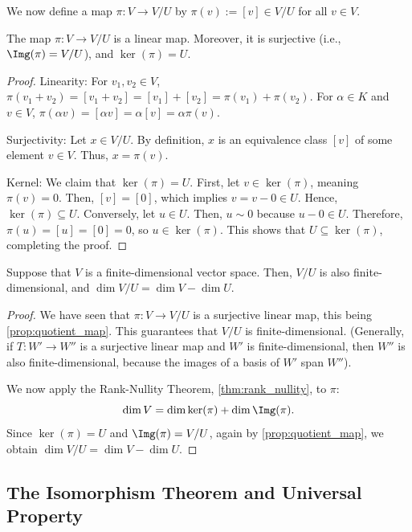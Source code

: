 We now define a map $\pi \colon V \to V/U$ by $\pi(v) := [v] \in V/U$ for all $v \in V$.

\begin{proposition}
  \label{prop:quotient_map}
  The map $\pi \colon V \to V/U$ is a linear map. Moreover, it is surjective (i.e., $\Img(\pi) = V/U$), and $\ker(\pi) = U$.
\end{proposition}

\begin{proof}
  Linearity: For $v_1, v_2 \in V$, $\pi(v_1 + v_2) = [v_1 + v_2] = [v_1] + [v_2] = \pi(v_1) + \pi(v_2)$. For $\alpha \in K$ and $v \in V$, $\pi(\alpha v) = [\alpha v] = \alpha [v] = \alpha \pi(v)$.

  Surjectivity: Let $x \in V/U$. By definition, $x$ is an equivalence class $[v]$ of some element $v \in V$. Thus, $x = \pi(v)$.

  Kernel: We claim that $\ker(\pi) = U$. First, let $v \in \ker(\pi)$, meaning $\pi(v) = 0$. Then, $[v] = [0]$, which implies $v = v - 0 \in U$. Hence, $\ker(\pi) \subseteq U$. Conversely, let $u \in U$. Then, $u \sim 0$ because $u - 0 \in U$. Therefore, $\pi(u) = [u] = [0] = 0$, so $u \in \ker(\pi)$. This shows that $U \subseteq \ker(\pi)$, completing the proof.
\end{proof}

\begin{proposition}
  \label{prop:dim_quotient}
  Suppose that $V$ is a finite-di\-men\-sional vector space. Then, $V/U$ is also finite-di\-men\-sional, and $\dim V/U = \dim V - \dim U$.
\end{proposition}

\begin{proof}
  We have seen that $\pi \colon V \to V/U$ is a surjective linear map, this being \cref{prop:quotient_map}. This guarantees that $V/U$ is finite-di\-men\-sional. (Generally, if $T \colon W' \to W''$ is a surjective linear map and $W'$ is finite-di\-men\-sional, then $W''$ is also finite-di\-men\-sional, because the images of a basis of $W'$ span $W''$).

  We now apply the Rank-Nullity Theorem, \cref{thm:rank_nullity}, to $\pi$:
  \[ \dim V = \dim \ker(\pi) + \dim \Img(\pi). \]
  Since $\ker(\pi) = U$ and $\Img(\pi) = V/U$, again by \cref{prop:quotient_map}, we obtain $\dim V/U = \dim V - \dim U$.
\end{proof}

\subsection{The Isomorphism Theorem and Universal Property}


